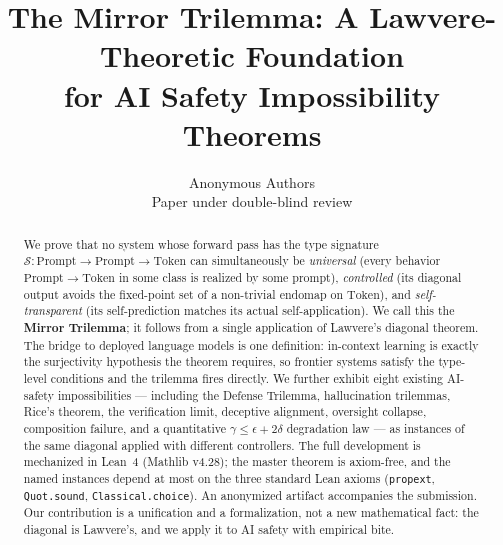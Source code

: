 \documentclass[11pt]{article}
\title{The Mirror Trilemma: A Lawvere-Theoretic Foundation\\
       for AI Safety Impossibility Theorems}
\author{%
  Anonymous Authors\\
  Paper under double-blind review
}
\begin{document}
\maketitle

\begin{abstract}
We prove that no system whose forward pass has the type signature
$\mathcal{S} : \mathrm{Prompt} \to \mathrm{Prompt} \to \mathrm{Token}$
can simultaneously be \emph{universal} (every behavior
$\mathrm{Prompt} \to \mathrm{Token}$ in some class is realized by some
prompt), \emph{controlled} (its diagonal output avoids the fixed-point
set of a non-trivial endomap on $\mathrm{Token}$), and
\emph{self-transparent} (its self-prediction matches its actual
self-application). We call this the \textbf{Mirror Trilemma}; it
follows from a single application of Lawvere's diagonal theorem.
The bridge to deployed language models is one definition: in-context
learning is exactly the surjectivity hypothesis the theorem requires,
so frontier systems satisfy the type-level conditions and the trilemma
fires directly.
We further exhibit eight existing AI-safety impossibilities ---
including the Defense Trilemma, hallucination trilemmas, Rice's
theorem, the verification limit, deceptive alignment, oversight
collapse, composition failure, and a quantitative
$\gamma \le \epsilon + 2\delta$ degradation law --- as instances of
the same diagonal applied with different controllers. The full
development is mechanized in Lean~4 (Mathlib v4.28); the master
theorem is axiom-free, and the named instances depend at most on the
three standard Lean axioms (\texttt{propext}, \texttt{Quot.sound},
\texttt{Classical.choice}). An anonymized artifact accompanies the
submission. Our contribution is a unification and a formalization,
not a new mathematical fact: the diagonal is Lawvere's, and we apply
it to AI safety with empirical bite.
\end{abstract}










\appendix

\end{document}
